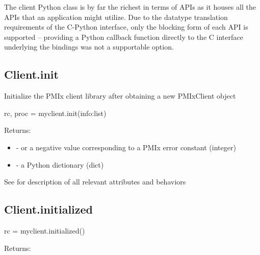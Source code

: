 The client Python class is by far the richest in terms of \acp{API} as it houses all the \acp{API} that an application might utilize. Due to the datatype translation requirements of the C-Python interface, only the blocking form of each \ac{API} is supported – providing a Python callback function directly to the C interface underlying the bindings was not a supportable option.

\subsection{Client.init}

\summary Initialize the \ac{PMIx} client library after obtaining a new PMIxClient object

\format

\pyspecificstart
\begin{codepar}
rc, proc = myclient.init(info:list)
\end{codepar}
\pyspecificend


\begin{arglist}
\end{arglist}

Returns:

\begin{itemize}
    \item {} -  or a negative value corresponding to a PMIx error constant (integer)
    \item {} - a Python  dictionary (dict)
\end{itemize}


See  for description of all relevant attributes and behaviors

\subsection{Client.initialized}

\format

\pyspecificstart
\begin{codepar}
rc = myclient.initialized()
\end{codepar}
\pyspecificend



Returns:

